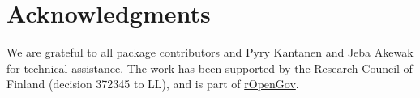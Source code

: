 \section{Acknowledgments}

We are grateful to all package contributors and Pyry Kantanen and Jeba
Akewak for technical assistance. The work has been supported by the
Research Council of Finland (decision 372345 to LL), and is part of
\href{https://ropengov.org/}{rOpenGov}.



\address{M\r{a}ns Magnusson\\
  Department of Statistics\\
  Uppsala University\\
  Sweden\\
  }

\address{Leo Lahti\\
  Department of Computing\\
  University of Turku\\
  Finland\\
  }
